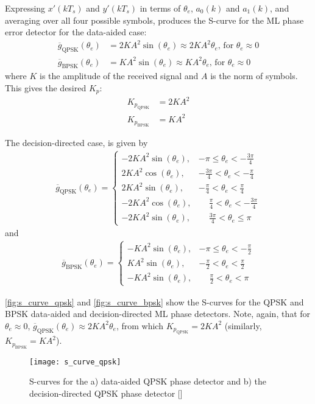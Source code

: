 Expressing $x'(kT_s)$ and $y'(kT_s)$ in terms of $\theta_e$, $a_0(k)$ and $a_1(k)$, and averaging over all four possible symbols, produces the S-curve for the ML phase error detector for the data-aided case:
\begin{align}
\overline{g}_{\text{QPSK}}(\theta_e) &= 2KA^2\sin(\theta_e)\approx 2KA^2\theta_e\text{, for }\theta_e\approx0\\
\overline{g}_{\text{BPSK}}(\theta_e) &= KA^2\sin(\theta_e)\approx KA^2\theta_e\text{, for }\theta_e\approx0
\end{align}
where $K$ is the amplitude of the received signal and $A$ is the norm of symbols. This gives the desired $K_p$:
\begin{align}
K_{p_{\text{QPSK}}} &= 2KA^2\\
K_{p_{\text{BPSK}}} &= KA^2
\end{align}

The decision-directed case, is given by
\begin{align}
  \overline{g}_{\text{QPSK}}(\theta_e)=
    \begin{cases}
      -2KA^2 \sin(\theta_e), &-\pi\leq\theta_e<-\frac{3\pi}{4}\\
      2KA^2 \cos(\theta_e), &-\frac{3\pi}{4}<\theta_e<-\frac{\pi}{4}\\
      2KA^2 \sin(\theta_e), &-\frac{\pi}{4}<\theta_e<\frac{\pi}{4}\\
      -2KA^2 \cos(\theta_e), &\phantom{-}\frac{\pi}{4}<\theta_e<-\frac{3\pi}{4}\\
      -2KA^2 \sin(\theta_e), &\phantom{-}\frac{3\pi}{4}<\theta_e\leq\pi
    \end{cases}
\end{align}
and
\begin{align}
  \overline{g}_{\text{BPSK}}(\theta_e)=
    \begin{cases}
      -KA^2 \sin(\theta_e), &-\pi\leq\theta_e<-\frac{\pi}{2}\\
      KA^2 \sin(\theta_e), &-\frac{\pi}{2}<\theta_e<\frac{\pi}{2}\\
      -KA^2 \sin(\theta_e), &\phantom{-}\frac{\pi}{2}<\theta_e<\pi
    \end{cases}
\end{align}

\autoref{fig:s_curve_qpsk} and \autoref{fig:s_curve_bpsk} show the S-curves for the QPSK and BPSK data-aided and decision-directed ML phase detectors. Note, again, that for $\theta_e\approx0$, $\overline{g}_{\text{QPSK}}(\theta_e)\approx 2KA^2\theta_e$, from which $K_{p_{\text{QPSK}}} = 2KA^2$ (similarly, $K_{p_{\text{BPSK}}} = KA^2$).
\begin{figure}[ht]
  \centering
  \texttt{[image: s\_curve\_qpsk]}
  \caption{S-curves for the a) data-aided QPSK phase detector and b) the decision-directed QPSK phase detector [\citeauthor{digcomm_discrete_approach}]}
  \label{fig:s_curve_qpsk}
\end{figure}

